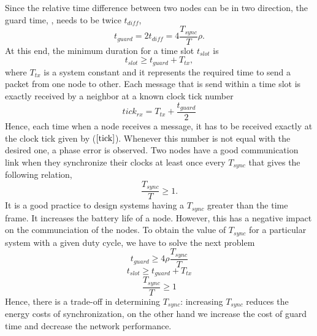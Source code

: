 \documentclass[a4paper,10pt]{report}
\begin{document}
\newline
Since the relative time difference between two nodes can be in two direction, the guard time, , needs to be twice $t_{diff}$,
\begin{equation}
t_{guard}= 2t_{diff} = 4\frac{T_{sync}}{T}\rho.
\end{equation}
At this end, the minimum duration for a time slot $t_{slot}$ is
\begin{equation}
t_{slot} \geq t_{guard} + T_{tx},
\end{equation}
where $T_{tx}$ is a system constant and it represents the required time to send a packet from one node to other. 
\newline Each message that is send within a time slot is exactly received by a neighbor at a known clock tick number
\begin{equation}
tick_{rx} = T_{tx}+ \frac{t_{guard}}{2} \label{tick}
\end{equation}
Hence, each time when a node receives a message, it has to be received exactly at the clock tick given by ($\ref{tick}$). Whenever
this number is not equal with the desired one, a phase error is observed. 
\newline 
Two nodes have a good communication link when they synchronize their clocks at least once every $T_{sync}$ that gives the following
relation,
\begin{equation}
\frac{T_{sync}}{T}\geq 1.
\end{equation}
It is a good practice to design systems having a $T_{sync}$ greater than the time frame. It increases the battery life of a node. However,
this has a negative impact on the communciation of the nodes. 
\newline
To obtain the value of $T_{sync}$ for a particular system with a given duty cycle, we have to solve the next problem
\begin{equation}
t_{guard} \geq 4\rho \frac{T_{sync}}{T}
\end{equation}
\begin{equation}
t_{slot} \geq t_{guard} + T_{tx}
\end{equation}
\begin{equation}
\frac{T_{sync}}{T} \geq 1
\end{equation}
Hence, there is a trade-off in determining $T_{sync}$: increasing $T_{sync}$ reduces the energy costs of synchronization, on the other
hand we increase the cost of guard time and decrease the network performance.
\end{document}
